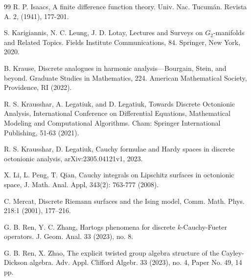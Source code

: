 \documentclass{amsart}
\theoremstyle{definition}
\theoremstyle{remark}
\numberwithin{equation}{section}
\begin{document}
\begin{thebibliography}{99}
 R. P. Isaacs,  A finite difference function theory. Univ. Nac. Tucum\'{a}n. Revista A. 2, (1941), 177-201.










    S. Karigiannis, N. C. Leung, J. D. Lotay,   Lectures and Surveys on $G_2$-manifolds and Related Topics.  Fields Institute Communications, 84. Springer, New York,  2020.

B. Krause,   Discrete analogues in harmonic analysis—Bourgain, Stein, and beyond. Graduate Studies in Mathematics, 224. American Mathematical Society, Providence, RI (2022).


   
















    R. S. Krausshar, A. Legatiuk, and D. Legatiuk,
    {    Towards Discrete Octonionic Analysis},  International Conference on Differential Equations, Mathematical Modeling and Computational Algorithms. Cham: Springer International Publishing,  51-63 (2021).


R. S. Krausshar, D. Legatiuk,
Cauchy formulae and Hardy spaces in discrete octonionic analysis,
arXiv:2305.04121v1, 2023.



X. Li, L. Peng, T. Qian,
 {Cauchy integrals on Lipschitz surfaces in octonionic space},
  J. Math. Anal. Appl, {343}(2): 763-777 (2008).

C. Mercat, Discrete Riemann surfaces and the Ising model, Comm. Math. Phys. 218:1 (2001),
177–216.





    G. B. Ren, Y. C. Zhang, Hartogs phenomena for discrete $k$-Cauchy-Fueter operators. J. Geom. Anal. 33 (2023), no. 8. 



         G. B. Ren, X. Zhao,  The explicit twisted group algebra structure of the Cayley-Dickson algebra. Adv. Appl. Clifford Algebr. 33 (2023), no. 4, Paper No. 49, 14 pp.



\end{thebibliography}
\end{document}
